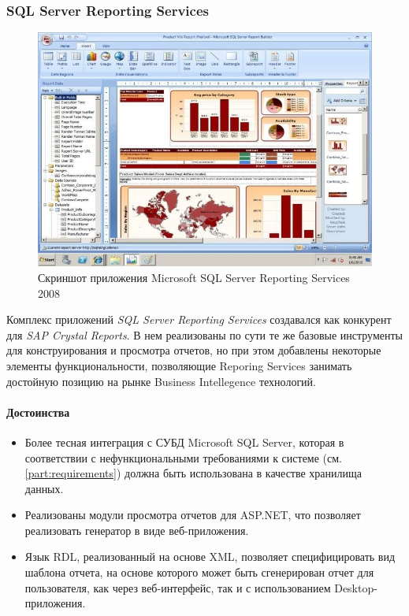 \subsubsection{SQL Server Reporting Services}
\begin{figure}[!ht]
\begin{center}
\hspace*{-1cm} \includegraphics[scale=0.7]{../resources/SQLReporting.jpg}
\caption{Скриншот приложения Microsoft SQL Server Reporting Services 2008}
\label{gr:crystal_screenshot}
\end{center}
\end{figure}
Комплекс приложений \textit{SQL Server Reporting Services} создавался как конкурент для
\textit{SAP Crystal Reports}. В нем реализованы по сути те же базовые инструменты для конструирования
и просмотра отчетов, но при этом добавлены некоторые элементы функциональности, 
позволяющие Reporing Services занимать достойную позицию на рынке Business Intellegence технологий.

\paragraph{Достоинства}
\begin{itemize}
\item{
Более тесная интеграция с СУБД Microsoft SQL Server, которая в соответствии 
с нефункциональными требованиями к системе (см. \ref{part:requirements}) должна быть
использована в качестве хранилища данных.
}
\item{
Реализованы модули просмотра отчетов для ASP.NET\cite{sql_reporting}, что позволяет
реализовать генератор в виде веб-приложения.
}
\item{
Язык RDL\cite{rdl_spec}, реализованный на основе XML, позволяет специфицировать вид шаблона отчета,
на основе которого может быть сгенерирован отчет для пользователя, как через 
веб-интерфейс, так и с использованием Desktop-приложения.
}
\end{itemize}

